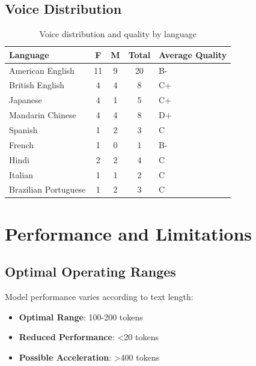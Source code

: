 \subsection{Voice Distribution}
\label{subsec:voice-distribution}

\begin{table}[H]
	\centering
	\label{tab:voice-distribution}
	\begin{tabular}{|l|c|c|c|l|}
		\hline
		\textbf{Language}  & \textbf{F} & \textbf{M} & \textbf{Total} & \textbf{Average Quality} \\
		\hline
		American English & 11         & 9          & 20             & B-                     \\
		\hline
		British English & 4          & 4          & 8              & C+                     \\
		\hline
		Japanese          & 4          & 1          & 5              & C+                     \\
		\hline
		Mandarin Chinese   & 4          & 4          & 8              & D+                     \\
		\hline
		Spanish          & 1          & 2          & 3              & C                      \\
		\hline
		French          & 1          & 0          & 1              & B-                     \\
		\hline
		Hindi            & 2          & 2          & 4              & C                      \\
		\hline
		Italian         & 1          & 1          & 2              & C                      \\
		\hline
		Brazilian Portuguese     & 1          & 2          & 3              & C                      \\
		\hline
	\end{tabular}
	\caption{Voice distribution and quality by language}
\end{table}

\section{Performance and Limitations}
\label{sec:performance}

\subsection{Optimal Operating Ranges}
\label{subsec:optimal-ranges}

Model performance varies according to text length:
\begin{itemize}
	\item \textbf{Optimal Range}: 100-200 tokens
	\item \textbf{Reduced Performance}: <20 tokens
	\item \textbf{Possible Acceleration}: >400 tokens
\end{itemize}

